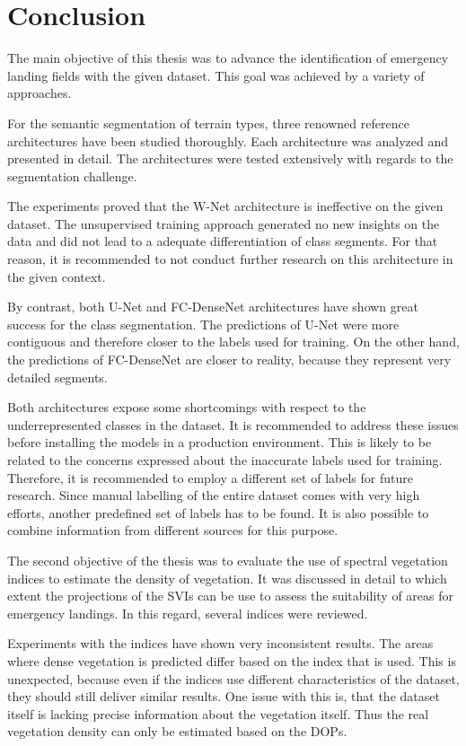 \section{Conclusion}
The main objective of this thesis was to advance the identification of emergency landing fields with the given dataset. This goal was achieved by a variety of approaches.

For the semantic segmentation of terrain types, three renowned reference architectures have been studied thoroughly. Each architecture was analyzed and presented in detail. The architectures were tested extensively with regards to the segmentation challenge.

The experiments proved that the W-Net architecture is ineffective on the given dataset. The unsupervised training approach generated no new insights on the data and did not lead to a adequate differentiation of class segments. For that reason, it is recommended to not conduct further research on this architecture in the given context.

By contrast, both U-Net and FC-DenseNet architectures have shown great success for the class segmentation. The predictions of U-Net were more contiguous and therefore closer to the labels used for training. On the other hand, the predictions of FC-DenseNet are closer to reality, because they represent very detailed segments. 

Both architectures expose some shortcomings with respect to the underrepresented classes in the dataset. It is recommended to address these issues before installing the models in a production environment. This is likely to be related to the concerns expressed about the inaccurate labels used for training. Therefore, it is recommended to employ a different set of labels for future research. Since manual labelling of the entire dataset comes with very high efforts, another predefined set of labels has to be found. It is also possible to combine information from different sources for  this purpose.

The second objective of the thesis was to evaluate the use of spectral vegetation indices to estimate the density of vegetation. It was discussed in detail to which extent the projections of the SVIs can be use to assess the suitability of areas for emergency landings. In this regard, several indices were reviewed.

Experiments with the indices have shown very inconsistent results. The areas where dense vegetation is predicted differ based on the index that is used. This is unexpected, because even if the indices use different characteristics of the dataset, they should still deliver similar results. One issue with this is, that the dataset itself is lacking precise information about the vegetation itself. Thus the real vegetation density can only be estimated based on the DOPs.

